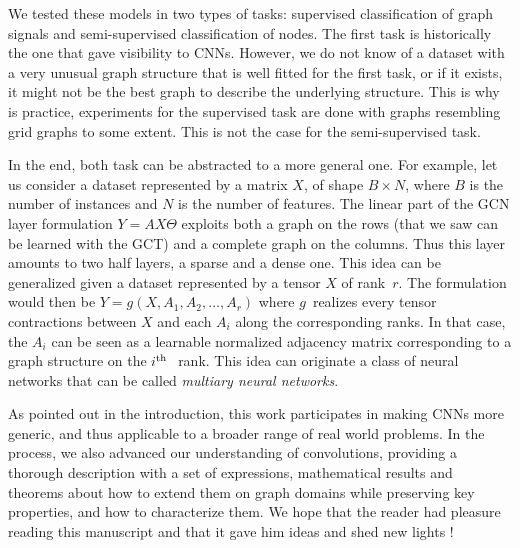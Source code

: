We tested these models in two types of tasks: supervised classification of graph signals and semi-supervised classification of nodes. The first task is historically the one that gave visibility to CNNs. However, we do not know of a dataset with a very unusual graph structure that is well fitted for the first task, or if it exists, it might not be the best graph to describe the underlying structure. This is why is practice, experiments for the supervised task are done with graphs resembling grid graphs to some extent. This is not the case for the semi-supervised task.

In the end, both task can be abstracted to a more general one. For example, let us consider a dataset represented by a matrix $X$, of shape $B \times N$, where $B$ is the number of instances and $N$ is the number of features. The linear part of the GCN layer formulation $Y = A X \Theta$ exploits both a graph on the rows (that we saw can be learned with the GCT) and a complete graph on the columns. Thus this layer amounts to two half layers, a sparse and a dense one. This idea can be generalized given a dataset represented by a tensor $X$ of rank~$r$. The formulation would then be $Y = g(X, A_1, A_2, \ldots, A_r)$ where $g$~realizes every tensor contractions between $X$ and each $A_i$ along the corresponding ranks. In that case, the $A_i$ can be seen as a learnable normalized adjacency matrix corresponding to a graph structure on the $i\text{$^\text{th}$~}$ rank. This idea can originate a class of neural networks that can be called \emph{multiary neural networks}.

As pointed out in the introduction, this work participates in making CNNs more generic, and thus applicable to a broader range of real world problems. In the process, we also advanced our understanding of convolutions, providing a thorough description with a set of expressions, mathematical results and theorems about how to extend them on graph domains while preserving key properties, and how to characterize them. We hope that the reader had pleasure reading this manuscript and that it gave him ideas and shed new lights !%